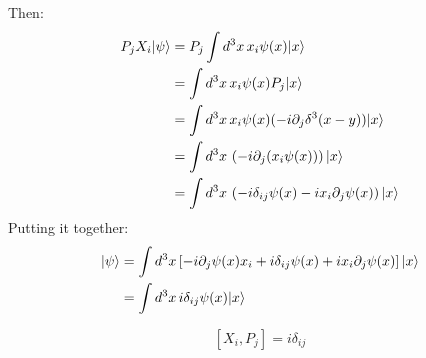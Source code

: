 \documentclass[12pt]{article}
\DeclarePairedDelimiter\ket{\lvert}{\rangle}
\begin{document}
Then:
\begin{align*}
P_j X_i \ket{\psi} &= P_j \int d^3x \, x_i \psi(x) \ket{x} \nonumber \\
&= \int d^3x \, x_i \psi(x) P_j \ket{x} \nonumber \\
&= \int d^3x \, x_i \psi(x) (-i \partial_j \delta^3(x - y)) \ket{x} \nonumber \\
&= \int d^3x \, \left( -i \partial_j (x_i \psi(x)) \right) \ket{x} \nonumber \\
&= \int d^3x \, \left( -i \delta_{ij} \psi(x) - i x_i \partial_j \psi(x) \right) \ket{x}
\label{eq:second_term}
\end{align*}
Putting it together:
\begin{align*}
[X_i, P_j] \ket{\psi} &= \int d^3x \left[ -i \partial_j \psi(x) x_i + i \delta_{ij} \psi(x) + i x_i \partial_j \psi(x) \right] \ket{x} \\
&= \int d^3x \, i \delta_{ij} \psi(x) \ket{x} \\
\end{align*}

\begin{equation}
    \boxed{[X_i, P_j] = i \delta_{ij}}
\end{equation}
\end{document}
